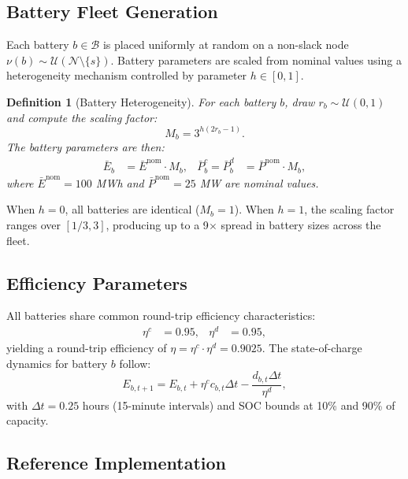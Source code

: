 \documentclass[11pt]{article}
\newtheorem{definition}{Definition}
\begin{document}
\subsection{Battery Fleet Generation}

Each battery $b \in \mathcal{B}$ is placed uniformly at random on a non-slack node $\nu(b) \sim \mathcal{U}(\mathcal{N} \setminus \{s\})$. Battery parameters are scaled from nominal values using a heterogeneity mechanism controlled by parameter $h \in [0, 1]$.

\begin{definition}[Battery Heterogeneity]
For each battery $b$, draw $r_b \sim \mathcal{U}(0,1)$ and compute the scaling factor:
\begin{equation}
    M_b = 3^{h(2r_b - 1)}.
\end{equation}
The battery parameters are then:
\begin{align}
    \bar{E}_b &= \bar{E}^{\text{nom}} \cdot M_b, & \bar{P}^c_b = \bar{P}^d_b &= \bar{P}^{\text{nom}} \cdot M_b,
\end{align}
where $\bar{E}^{\text{nom}} = 100$ MWh and $\bar{P}^{\text{nom}} = 25$ MW are nominal values.
\end{definition}

When $h = 0$, all batteries are identical ($M_b = 1$). When $h = 1$, the scaling factor ranges over $[1/3, 3]$, producing up to a 9$\times$ spread in battery sizes across the fleet.

\subsection{Efficiency Parameters}

All batteries share common round-trip efficiency characteristics:
\begin{align}
    \eta^c &= 0.95, & \eta^d &= 0.95,
\end{align}
yielding a round-trip efficiency of $\eta = \eta^c \cdot \eta^d = 0.9025$. The state-of-charge dynamics for battery $b$ follow:
\begin{equation}
    E_{b,t+1} = E_{b,t} + \eta^c c_{b,t} \Delta t - \frac{d_{b,t} \Delta t}{\eta^d},
\end{equation}
with $\Delta t = 0.25$ hours (15-minute intervals) and SOC bounds at 10\% and 90\% of capacity.

\subsection{Reference Implementation}
\end{document}
